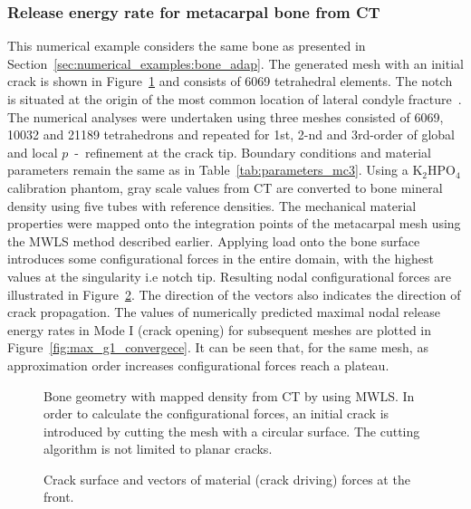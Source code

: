 \documentclass[11pt]{acmeArticle}
\numberwithin{equation}{section}
\begin{document}
\subsubsection{Release energy rate for metacarpal bone from CT}
This numerical example considers the same bone as presented in Section~\ref{sec:numerical_examples:bone_adap}. 
The generated mesh with an initial crack is shown in Figure~\ref{fig:bone_ct_mesh_cut} and consists of 6069 tetrahedral elements. 
The notch is situated at the origin of the most common location of lateral condyle fracture~\citep{jacklin2012frequency}. 
The numerical analyses were undertaken using three meshes consisted of 6069, 10032 and 21189 tetrahedrons and repeated for 1st, 2-nd and 3rd-order of global and local $p$~-~refinement at the crack tip. 
Boundary conditions and material parameters remain the same as in Table~\ref{tab:parameters_mc3}. 
Using a $ \mathrm {K_2 HPO_4  }$ calibration phantom, gray scale values from CT are converted to bone mineral density using five tubes with reference densities. 
The mechanical material properties were mapped onto the integration points of the metacarpal mesh using the MWLS method described earlier. 
Applying load onto the bone surface introduces some configurational forces in the entire domain, with the highest values at the singularity i.e notch tip. 
Resulting nodal configurational forces are illustrated in Figure~\ref{fig:crackfrontforce}. 
The direction of the vectors also indicates the direction of crack propagation.
The values of numerically predicted maximal nodal release energy rates in Mode I (crack opening) for subsequent meshes are plotted in Figure~\ref{fig:max_g1_convergece}. 
It can be seen that, for the same mesh, as approximation order increases configurational forces reach a plateau. 
\begin{figure}
	\centering
		\def\svgwidth{10cm}
		
	\caption{Bone geometry with mapped density from CT by using MWLS. In order to calculate the configurational forces, an initial crack is introduced by cutting the mesh with a circular surface. The cutting algorithm is not limited to planar cracks. }
	\label{fig:bone_ct_mesh_cut}
\end{figure}

\begin{figure}
	\centering
	\def\svgwidth{12cm}
	
	\caption{Crack surface and vectors of material (crack driving) forces at the front.}
	\label{fig:crackfrontforce}
\end{figure}
\end{document}
